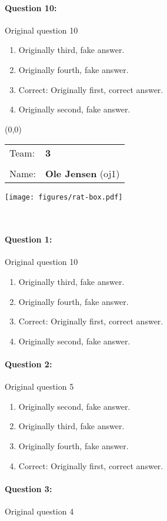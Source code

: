 \documentclass[9pt, twoside, twocolumn]{extarticle}
\renewcommand{\includegraphics}[2][]{\OldIncludegraphics[width=\linewidth, #1]{#2}}
\newcommand{\individualprefix}[3]{%
\begin{textblock}{3.5}(0,0)
\fontfamily{phv}\selectfont
\begin{tabular}{ll}
Team: & \Large\linespread{6} \textbf{#3}\\
      & \\
Name: & \Large\linespread{6} \textbf{#1} (#2)
\end{tabular}

\texttt{[image: figures/rat-box.pdf]}
\end{textblock}
\textcolor{white}{.}\\ %
\vspace{6cm}
}%
\begin{document}
\paragraph{Question 10:}
Original question 10

\begin{enumerate}[label=\textbf{{\Alph*}},labelindent=0pt, labelsep=1.5em, parsep=0.2em]
\item Originally third, fake answer.
\item Originally fourth, fake answer.
\item Correct: Originally first, correct answer.
\item Originally second, fake answer.
\end{enumerate}
\cleardoublepage
\newpage

\individualprefix{Ole Jensen}{oj1}{3}

\paragraph{Question 1:}
Original question 10

\begin{enumerate}[label=\textbf{{\Alph*}},labelindent=0pt, labelsep=1.5em, parsep=0.2em]
\item Originally third, fake answer.
\item Originally fourth, fake answer.
\item Correct: Originally first, correct answer.
\item Originally second, fake answer.
\end{enumerate}
\paragraph{Question 2:}
Original question 5

\begin{enumerate}[label=\textbf{{\Alph*}},labelindent=0pt, labelsep=1.5em, parsep=0.2em]
\item Originally second, fake answer.
\item Originally third, fake answer.
\item Originally fourth, fake answer.
\item Correct: Originally first, correct answer.
\end{enumerate}
\paragraph{Question 3:}
Original question 4
\end{document}
